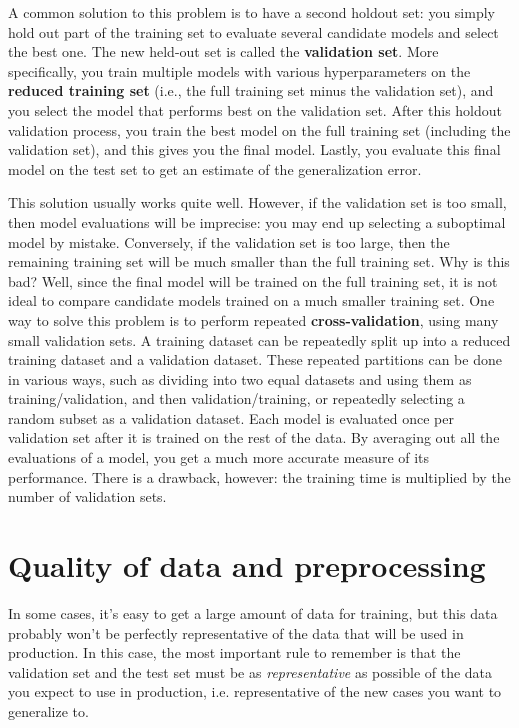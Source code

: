 A common solution to this problem is to have a second holdout set: you simply hold out part of the training set to evaluate several candidate models and select the best one. The new held-out set is called the \textbf{validation set}. More specifically, you train multiple models with various hyperparameters on the \textbf{reduced training set} (i.e., the full training set minus the validation set), and you select the model that performs best on the validation set. After this holdout validation process, you train the best model on the full training set (including the validation set), and this gives you the final model. Lastly, you evaluate this final model on the test set to get an estimate of the generalization error.

This solution usually works quite well. However, if the validation set is too small, then model evaluations will be imprecise: you may end up selecting a suboptimal model by mistake. Conversely, if the validation set is too large, then the remaining training set will be much smaller than the full training set. Why is this bad? Well, since the final model will be trained on the full training set, it is not ideal to compare candidate models trained on a much smaller training set. One way to solve this problem is to perform repeated \textbf{cross-validation}, using many small validation sets. A training dataset can be repeatedly split up into a reduced training dataset and a validation dataset. These repeated partitions can be done in various ways, such as dividing into two equal datasets and using them as training/validation, and then validation/training, or repeatedly selecting a random subset as a validation dataset. Each model is evaluated once per validation set after it is trained on the rest of the data. By averaging out all the evaluations of a model, you get a much more accurate measure of its performance. There is a drawback, however: the training time is multiplied by the number of validation sets.
\section{Quality of data and preprocessing}
In some cases, it's easy to get a large amount of data for training, but this data probably won't be perfectly representative of the data that will be used in production. In this case, the most important rule to remember is that the validation set and the test set must be as \emph{representative} as possible of the data you expect to use in production, i.e. representative of the new cases you want to generalize to.

